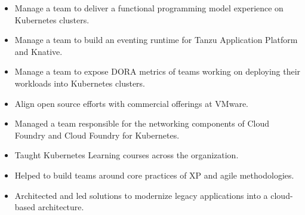 \documentclass[10pt,a4paper,ragged2e,withhyper]{altacv}
\begin{document}


\begin{fullwidth}
\makecvheader
\end{fullwidth}


\begin{paracol}{2}

\begin{itemize}
\item Manage a team to deliver a functional programming model experience on Kubernetes clusters.
\item Manage a team to build an eventing runtime for Tanzu Application Platform and Knative.
\item Manage a team to expose DORA metrics of teams working on deploying their workloads into Kubernetes clusters.
\item Align open source efforts with commercial offerings at VMware.
\end{itemize}

\divider

\begin{itemize}
\item Managed a team responsible for the networking components of Cloud Foundry and Cloud Foundry for Kubernetes.
\item Taught Kubernetes Learning courses across the organization.
\end{itemize}

\divider

\begin{itemize}
\item Helped to build teams around core practices of XP and agile methodologies.
\item Architected and led solutions to modernize legacy applications into a cloud-based architecture.
\end{itemize}


\end{paracol}
\end{document}
